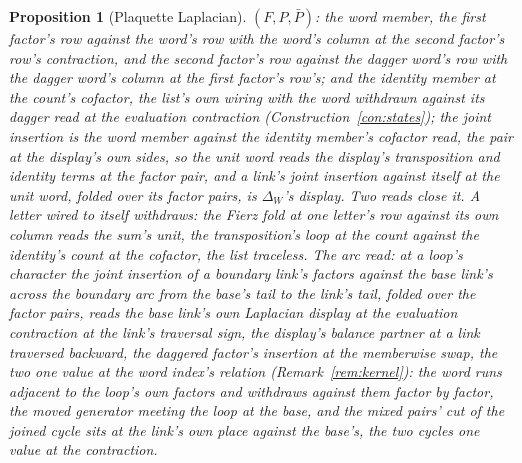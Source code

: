 \documentclass[11pt]{article}
\newtheorem{proposition}{Proposition}
\theoremstyle{definition}
\begin{document}
\begin{proposition}[Plaquette Laplacian]
$(F,P,\bar P)$: the \emph{word member}, the first factor's row
against the word's row with the word's column at the second
factor's row's contraction, and the second factor's row against
the dagger word's row with the dagger word's column at the first
factor's row's; and the \emph{identity member} at the count's
cofactor, the list's own wiring with the word withdrawn against
its dagger read at the evaluation contraction
(Construction~\ref{con:states}); the joint insertion is the word
member against the identity member's cofactor read, the pair at
the display's own sides, so the unit word reads the display's
transposition and identity terms at the factor pair, and a link's
joint insertion against itself at the unit word, folded over its
factor pairs, is $\Delta_W$'s display. Two reads close it. \emph{A
letter wired to itself withdraws}: the Fierz fold at one letter's
row against its own column reads the sum's unit, the
transposition's loop at the count against the identity's count at
the cofactor, the list traceless. \emph{The arc read}: at a loop's
character the joint insertion of a boundary link's factors against
the base link's across the boundary arc from the base's tail to
the link's tail, folded over the factor pairs, reads the base
link's own Laplacian display at the evaluation contraction at the
link's traversal sign, the display's balance partner at a link
traversed backward, the daggered factor's insertion at the
memberwise swap, the two one value at the word index's relation
(Remark~\ref{rem:kernel}): the word runs adjacent to the loop's own
factors and withdraws against them factor by factor, the moved
generator meeting the loop at the base, and the mixed pairs' cut
of the joined cycle sits at the link's own place against the
base's, the two cycles one value at the contraction.
\end{proposition}
\end{document}
